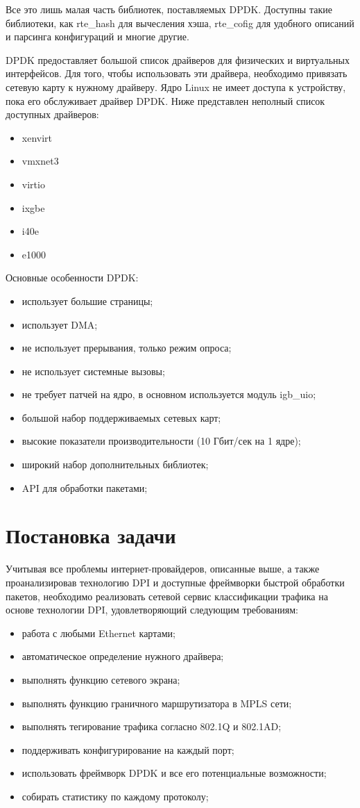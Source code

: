 Все это лишь малая часть библиотек, поставляемых DPDK. Доступны такие библиотеки, как rte\_hash для вычесления хэша, rte\_cofig для удобного описаний и парсинга конфигураций и многие другие.

DPDK предоставляет большой список драйверов для физических и виртуальных интерфейсов. Для того, чтобы использовать эти драйвера, необходимо привязать сетевую карту к нужному драйверу. Ядро Linux не имеет доступа к устройству, пока его обслуживает драйвер DPDK. Ниже представлен неполный список доступных драйверов:
\begin{itemize}
\item xenvirt
\item vmxnet3
\item virtio
\item ixgbe
\item i40e
\item e1000
\end{itemize}

Основные особенности DPDK:
\begin{itemize}
\item использует большие страницы;
\item использует DMA;
\item не использует прерывания, только режим опроса;
\item не использует системные вызовы;
\item не требует патчей на ядро, в основном используется модуль igb\_uio;
\item большой набор поддерживаемых сетевых карт;
\item высокие показатели производительности (10 Гбит/сек на 1 ядре);
\item широкий набор дополнительных библиотек;
\item API для обработки пакетами;
\end{itemize}

\section{Постановка задачи}
Учитывая все проблемы интернет-провайдеров, описанные выше, а также проанализировав технологию DPI и доступные фреймворки быстрой обработки пакетов, необходимо реализовать сетевой сервис классификации трафика на основе технологии DPI, удовлетворяющий следующим требованиям:
\begin{itemize}
\item работа с любыми Ethernet картами;
\item автоматическое определение нужного драйвера;
\item выполнять функцию сетевого экрана;
\item выполнять функцию граничного маршрутизатора в MPLS сети;
\item выполнять тегирование трафика согласно 802.1Q и 802.1AD;
\item поддерживать конфигурирование на каждый порт;
\item использовать фреймворк DPDK и все его потенциальные возможности;
\item собирать статистику по каждому протоколу;
\end{itemize}

